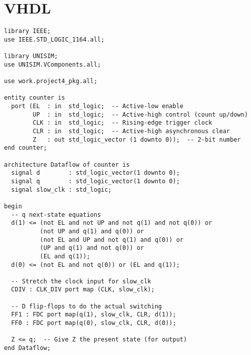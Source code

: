 \documentclass{article}
\begin{document}


\section{VHDL}
\label{sec:vhdl}

\begin{verbatim}
library IEEE;
use IEEE.STD_LOGIC_1164.all;

library UNISIM;
use UNISIM.VComponents.all;

use work.project4_pkg.all;

entity counter is
  port (EL  : in  std_logic;  -- Active-low enable
        UP  : in  std_logic;  -- Active-high control (count up/down)
        CLK : in  std_logic;  -- Rising-edge trigger clock
        CLR : in  std_logic;  -- Active-high asynchronous clear
        Z   : out std_logic_vector (1 downto 0));  -- 2-bit number
end counter;

architecture Dataflow of counter is
  signal d        : std_logic_vector(1 downto 0);
  signal q        : std_logic_vector(1 downto 0);
  signal slow_clk : std_logic;

begin
  -- q next-state equations
  d(1) <= (not EL and not UP and not q(1) and not q(0)) or
          (not UP and q(1) and q(0)) or
          (not EL and UP and not q(1) and q(0)) or
          (UP and q(1) and not q(0)) or
          (EL and q(1));
  d(0) <= (not EL and not q(0)) or (EL and q(1));

  -- Stretch the clock input for slow_clk
  CDIV : CLK_DIV port map (CLK, slow_clk);

  -- D flip-flops to do the actual switching
  FF1 : FDC port map(q(1), slow_clk, CLR, d(1));
  FF0 : FDC port map(q(0), slow_clk, CLR, d(0));

  Z <= q;  -- Give Z the present state (for output)
end Dataflow;
\end{verbatim}
\end{document}
